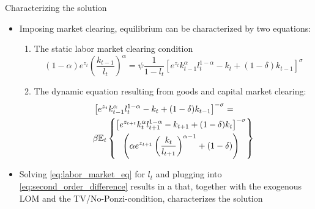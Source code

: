 \documentclass[handout,usepdftitle=false,xcolor=dvipsnames,aspectratio=169]{beamer}
\begin{document}
\renewcommand{\Source}{\textcite{Krueger2012}, Ch. 4.6}
\begin{frame}{Characterizing the solution}
\begin{itemize}[<+->]
\item Imposing market clearing, equilibrium can be characterized by two equations:
    \begin{enumerate}
        \item The static labor market clearing condition
            \begin{equation}
               (1-\alpha)e^{z_{t}} \left(\frac{{k}_{t-1}}{l_t} \right)^{\alpha} =  \psi \frac{1}{1-l_t}\left[{e^{z_{t}}{k}_{t-1}^{\alpha} l_t^{1-\alpha}- {k}_{t}+ (1-\delta) {k}_{t-1} }\right]^{\sigma}  \label{eq:labor_market_eq}
            \end{equation}
        \item The dynamic equation resulting from goods and capital market clearing:
            \begin{align}
                &\left[e^{z_{t}}{k}_{t-1}^{\alpha} l_t^{1-\alpha}- {k}_{t}+ (1-\delta) {k}_{t-1}\right]^{-\sigma} = \notag\\
                 &\beta \mathbb{E}_t \left\{\begin{gathered}
                 \left[e^{z_{t+t}}k_{t}^{\alpha} l_{t+1}^{1-\alpha}- k_{t+1}+ (1-\delta) {k}_{t}\right]^{-\sigma}\\
                  \left(\alpha e^{z_{t+1}} \left(\frac{{k}_{t}}{l_{t+1}} \right)^{\alpha-1} + (1-\delta) \right)\\
                  \end{gathered} \right\} \label{eq:second_order_difference}
            \end{align}
    \end{enumerate}
\item Solving \eqref{eq:labor_market_eq} for $l_t$ and plugging into \eqref{eq:second_order_difference} results in a  that, together with the exogenous LOM and the TV/No-Ponzi-condition, characterizes the solution
\end{itemize}
\end{frame}
\end{document}
